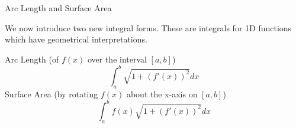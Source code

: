 \documentclass{beamer}
\begin{document}
\begin{frame}{Arc Length and Surface Area}

We now introduce two new integral forms. These are integrals for 1D functions which have geometrical interpretations. 

    Arc Length (of $f(x)$ over the interval $[a, b]$)
    \[
        \int_a^b \sqrt{1 + (f'(x))^2}dx
    \]
    Surface Area (by rotating $f(x)$ about the x-axis on $[a,b]$)
    \[
        \int_a^b f(x)\sqrt{1 + (f'(x))^2}dx
    \]

\end{frame}
\end{document}
